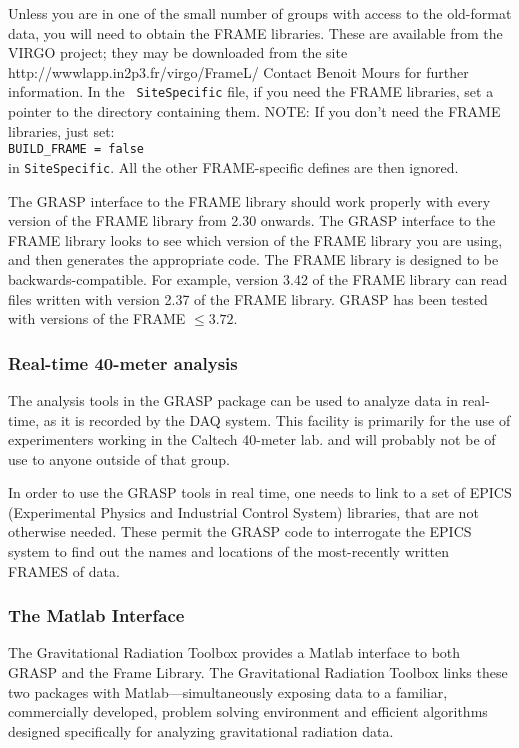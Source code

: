 Unless you are in one of the small number of groups with access to
the old-format data, you will need to obtain the FRAME libraries.
These are available from the VIRGO project; they may be downloaded from
the site
{http://wwwlapp.in2p3.fr/virgo/FrameL/}
Contact Benoit
Mours
 for further information.  In the {\tt
SiteSpecific} file, if you need the FRAME libraries, set a pointer to the
directory containing them.  NOTE: If you don't need the FRAME libraries,
just set:\\ {\tt BUILD\_FRAME = false}\\ in {\tt SiteSpecific}.  All the
other FRAME-specific defines are then ignored.

The GRASP interface to the FRAME library should work properly with
every version of the FRAME library from 2.30 onwards.  The GRASP
interface to the FRAME library looks to see which version of the FRAME
library you are using, and then generates the appropriate code.  The
FRAME library is designed to be backwards-compatible.  For example,
version 3.42 of the FRAME library can read files written with version
2.37 of the FRAME library. GRASP has been tested with versions of the FRAME
$\le 3.72$.


\subsubsection{Real-time 40-meter analysis}
The analysis tools in the GRASP package can be used to analyze data
in real-time, as it is recorded by the DAQ system.  This facility is
primarily for the use of experimenters working in the Caltech 40-meter lab.
and will probably not be of use to anyone outside of that group.

In order to use the GRASP tools in real time, one needs to link to
a set of EPICS (Experimental Physics and Industrial Control System)
libraries, that are not otherwise needed.  These permit the GRASP code
to interrogate the EPICS system to find out the names and locations of
the most-recently written FRAMES of data.

\subsubsection{The Matlab Interface}
\label{sss:GRtoolboxInstall}
The Gravitational Radiation Toolbox provides a
Matlab interface to both GRASP and the Frame Library.
The Gravitational Radiation Toolbox links these two packages with
Matlab---simultaneously exposing data to a familiar, commercially developed,
problem solving environment and efficient algorithms designed specifically for
analyzing gravitational radiation data.

